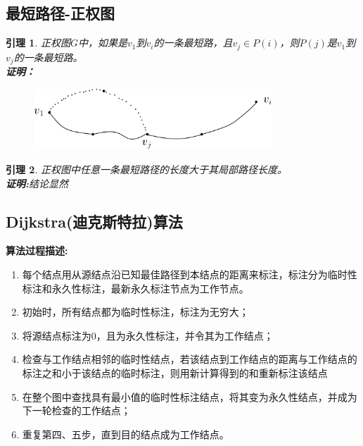 \documentclass[11pt,a4paper,openany]{book}
\newtheorem{lemma}{\textbf{引理}}[section]
\begin{document}
\subsection{最短路径-正权图}
\begin{lemma}\K
正权图$G$中，如果是$v_1$到$v_i$的一条最短路，且$v_j\in P(i)$，则$P(j)$是$v_1$到$v_j$的一条最短路。\\
\textbf{证明：}
\begin{figure}[H]
  \centering
  \includegraphics[width=0.8\textwidth]{2.6.1.png}\\
  \caption*{}
\end{figure}
\end{lemma}
\begin{lemma}\K
正权图中任意一条最短路径的长度大于其局部路径长度。\\
\textbf{证明:}结论显然
\end{lemma}
\subsection{Dijkstra(迪克斯特拉)算法}
\textbf{算法过程描述:}\\
\begin{enumerate}
  \item 每个结点用从源结点沿已知最佳路径到本结点的距离来\textcolor[rgb]{1.00,0.00,0.00}{标注}，标注分为\textcolor[rgb]{1.00,0.00,0.00}{临时性标注}和\textcolor[rgb]{1.00,0.00,0.00}{永久性标注}，最新永久标注节点为\textcolor[rgb]{1.00,0.00,0.00}{工作节点}。
  \item 初始时，所有结点都为临时性标注，标注为无穷大；
  \item 将源结点标注为$0$，且为永久性标注，并令其为工作结点；
  \item 检查与工作结点相邻的临时性结点，若该结点到工作结点的距离与工作结点的标注之和小于该结点的临时标注，则用新计算得到的和重新标注该结点
  \item 在整个图中查找具有最小值的临时性标注结点，将其变为永久性结点，并成为下一轮检查的工作结点；
  \item 重复第四、五步，直到目的结点成为工作结点。
\end{enumerate}
\end{document}
